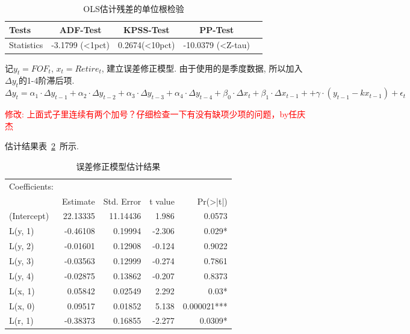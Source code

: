 \documentclass[10.5pt,onecolumn,a4paper]{article}%
\begin{document}
\begin{table}[ht]
    \centering
    \caption{OLS估计残差的单位根检验}
    \label{tab:coin-OLS-resid-uniroot}
    \begin{tabular}{l | cccc}
        Tests        & ADF-Test       & KPSS-Test      & PP-Test               \\  \hline
        Statistics   & -3.1799 (<1pct) & 0.2674(<10pct) & -10.0379 (<Z-tau)
    \end{tabular}
\end{table}

记$y_t = FOF_t$, $x_t = Retire_t$, 建立误差修正模型. 由于使用的是季度数据, 所以加入$\Delta y_t$的1-4阶滞后项.
$$\Delta y_t = \alpha_1 \cdot \Delta y_{t-1} + \alpha_2  \cdot \Delta  y_{t-2} + \alpha_3 \cdot \Delta  y_{t-3} + \alpha_4 \cdot \Delta  y_{t-4} + \beta_0 \cdot \Delta  x_t+\beta_1 \cdot \Delta  x_{t-1} + +\gamma \cdot ( y_{t-1}-kx_{t-1}) + \epsilon_t$$

\textcolor{red}{修改: 上面式子里连续有两个加号？仔细检查一下有没有缺项少项的问题，by任庆杰}

估计结果表~\ref{tab:coin-correction-model}~所示.
\begin{table}[ht]
    \centering
    \caption{误差修正模型估计结果}
    \label{tab:coin-correction-model}
    \begin{tabular}{l | rrrr}
        Coefficients: &          &            &         &                     \\
                      & Estimate & Std. Error & t value & Pr(\textgreater|t|) \\  \hline
        (Intercept)   & 22.13335 & 11.14436   & 1.986   & 0.0573              \\
        L(y, 1)       & -0.46108 & 0.19994    & -2.306  & 0.029*             \\
        L(y, 2)       & -0.01601 & 0.12908    & -0.124  & 0.9022              \\
        L(y, 3)       & -0.03563 & 0.12999    & -0.274  & 0.7861              \\
        L(y, 4)       & -0.02875 & 0.13862    & -0.207  & 0.8373              \\
        L(x, 1)       & 0.05842  & 0.02549    & 2.292   & 0.03*              \\
        L(x, 0)       & 0.09517  & 0.01852    & 5.138   & 0.000021***        \\
        L(r, 1)       & -0.38373 & 0.16855    & -2.277  & 0.0309*
    \end{tabular}
\end{table}
\end{document}
